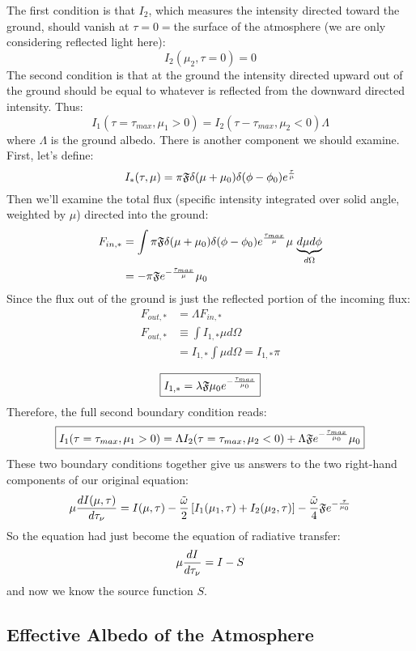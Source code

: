 \documentclass[11pt]{article}
\begin{document}
The first condition is that $I_2$, which measures the intensity directed toward
the ground, should vanish at $\tau=0=$the surface of the atmosphere (we are
only considering reflected light here):
$$I_2(\mu_2,\tau=0)=0$$
The second condition is that at the ground the intensity directed upward out
of the ground should be equal to whatever is reflected from the downward
directed intensity.  Thus:
$$I_1(\tau=\tau_{max},\mu_1>0)=I_2(\tau-\tau_{max},\mu_2<0)\Lambda$$
where $\Lambda$ is the ground albedo.  There is another component we should
examine.  First, let's define:
$$I_*(\tau,\mu)=\pi\mathfrak{F}\delta(\mu+\mu_0)\delta(\phi-\phi_0)e^{\tau\over\mu}$$
Then we'll examine the total flux (specific intensity integrated over solid
angle, weighted by $\mu$) directed into the ground:
\def\taum{{\tau_{max}}}
$$\begin{aligned}F_{in,*}
&=\int{\pi\mathfrak{F}\delta(\mu+\mu_0)\delta(\phi-\phi_0)e^{\taum\over\mu}\mu
\,\underbrace{d\mu d\phi}_{d\Omega}}\\ 
&=-\pi\mathfrak{F}e^{-{\taum\over\mu}}\mu_0\\ \end{aligned}$$
Since the flux out of the ground is just the reflected portion of the incoming
flux:
$$\begin{aligned}F_{out,*}&=\Lambda F_{in,*}\\ 
F_{out,*}&\equiv\int{I_{1,*}\mu d\Omega}\\ 
&=I_{1,*}\int{\mu d\Omega}=I_{1,*}\pi\\ \end{aligned}$$
$$\boxed{I_{1,*}=\lambda\mathfrak{F}\mu_0e^{-{\taum\over\mu_0}}}$$
Therefore, the full second boundary condition reads:
$$\boxed{I_1(\tau=\taum,\mu_1>0)=\Lambda I_2(\tau=\taum,\mu_2<0)
+\Lambda\mathfrak{F}e^{-{\taum\over\mu_0}}\mu_0}$$
These two boundary conditions together give us answers to the two right-hand 
components of our original equation:
$$\mu{dI(\mu,\tau)\over d\tau_\nu}=I(\mu,\tau)-{{\tilde\omega}\over2}\left[I_1(\mu_1,\tau)+
I_2(\mu_2,\tau)\right]-{{\tilde\omega}\over4}\mathfrak{F}e^{-{\tau\over\mu_0}}$$
So the equation had just become the equation of radiative transfer:
$$\mu{dI\over d\tau_\nu}=I-S$$
and now we know the source function $S$.

\subsection*{ Effective Albedo of the Atmosphere }
\end{document}
